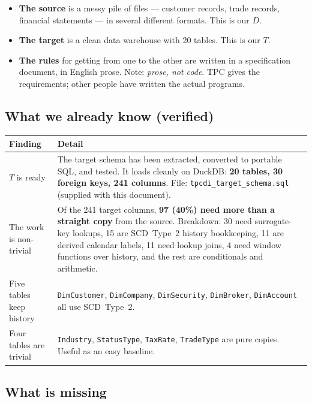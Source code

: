 \documentclass[11pt,a4paper]{article}
\newcommand{\code}[1]{\texttt{\small #1}}
\begin{document}
\begin{itemize}
\item \textbf{The source} is a messy pile of files --- customer records, trade records,
  financial statements --- in several different formats. This is our $D$.
\item \textbf{The target} is a clean data warehouse with 20 tables. This is our $T$.
\item \textbf{The rules} for getting from one to the other are written in a
  specification document, in English prose. Note: \emph{prose, not code}. TPC gives the
  requirements; other people have written the actual programs.
\end{itemize}

\subsection{What we already know (verified)}

\begin{center}
\begin{tabular}{@{}L{4.2cm}L{11.3cm}@{}}
\toprule
\textbf{Finding} & \textbf{Detail} \\
\midrule
$T$ is ready & The target schema has been extracted, converted to portable SQL, and
tested. It loads cleanly on DuckDB: \textbf{20 tables, 30 foreign keys, 241 columns}.
File: \code{tpcdi\_target\_schema.sql} (supplied with this document). \\
\addlinespace[2pt]
The work is non-trivial & Of the 241 target columns, \textbf{97 (40\%) need more than a
straight copy} from the source. Breakdown: 30 need surrogate-key lookups, 15 are SCD~Type~2
history bookkeeping, 11 are derived calendar labels, 11 need lookup joins, 4 need window
functions over history, and the rest are conditionals and arithmetic. \\
\addlinespace[2pt]
Five tables keep history & \code{DimCustomer}, \code{DimCompany}, \code{DimSecurity},
\code{DimBroker}, \code{DimAccount} all use SCD~Type~2. \\
\addlinespace[2pt]
Four tables are trivial & \code{Industry}, \code{StatusType}, \code{TaxRate},
\code{TradeType} are pure copies. Useful as an easy baseline. \\
\bottomrule
\end{tabular}
\end{center}

\subsection{What is missing}
\end{document}
